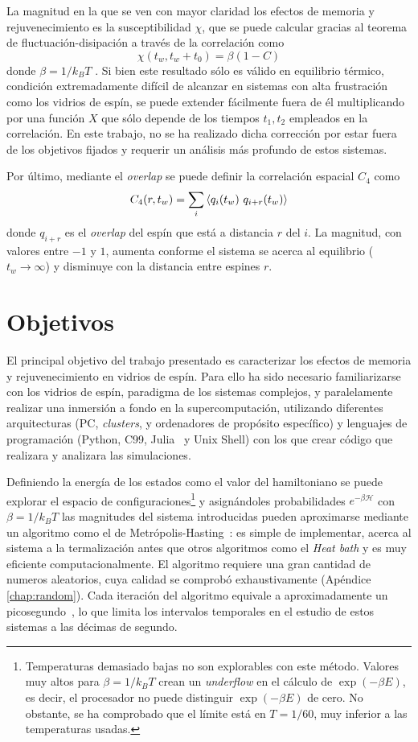 \documentclass[11pt]{report}
\newcommand{\Ham}{\mathscr{H}}
\newcommand{\sub}[1]{ _{{\scriptscriptstyle \mathit{#1}}}  }
\newcommand{\kb}{k\sub{B}}
\begin{document}
La magnitud en la que se ven con mayor claridad los efectos de memoria
y rejuvenecimiento es la susceptibilidad $χ$, que se puede calcular
gracias al teorema de fluctuación-disipación a través de la
correlación como
\begin{equation}
  χ(t_w, t_w+t_0) = β(1-C)
\end{equation}
donde $β=1/\kb T$ . Si bien este resultado sólo es válido en
equilibrio térmico, condición extremadamente difícil de alcanzar en
sistemas con alta frustración como los vidrios de espín, se puede
extender fácilmente fuera de él multiplicando por una función $X$ que
sólo depende de los tiempos $t_1,t_2$ empleados en la correlación. En
este trabajo, no se ha realizado dicha corrección por estar fuera de
los objetivos fijados y requerir un análisis más profundo de estos
sistemas.

Por último, mediante el \textit{overlap} se puede definir la
correlación espacial $C_4$ como
\begin{equation}
  C_4(r,t_w) =  \sum_{i} \expval{q_i(t_w)\ q_{i+r}(t_w)}
\end{equation}
donde $q_{i+r}$ es el \textit{overlap} del espín que está a distancia
$r$ del $i$. La magnitud, con valores entre $-1$ y $1$, aumenta
conforme el sistema se acerca al equilibrio ($t_w→∞$) y disminuye con
la distancia entre espines $r$.

\chapter{Objetivos}
El principal objetivo del trabajo presentado es caracterizar los
efectos de memoria y rejuvenecimiento en vidrios de espín. Para ello
ha sido necesario familiarizarse con los vidrios de espín, paradigma
de los sistemas complejos, y paralelamente realizar una inmersión a
fondo en la supercomputación, utilizando diferentes arquitecturas (PC,
\textit{clusters}, y ordenadores de propósito específico) y lenguajes
de programación (Python, C99, Julia~\cite{julialang} y Unix Shell)
con los que crear código que realizara y analizara las simulaciones.

Definiendo la energía de los estados como el valor del hamiltoniano se
puede explorar el espacio de configuraciones\footnote{ Temperaturas
  demasiado bajas no son explorables con este método. Valores muy
  altos para $β=1/\kb T$ crean un \textit{underflow} en el cálculo de
  $\exp(-βE)$, es decir, el procesador no puede distinguir $\exp(-βE)$
  de cero. No obstante, se ha comprobado que el límite está en
  $T=1/60$, muy inferior a las temperaturas usadas. } y asignándoles
probabilidades $e^{-β \Ham}$ con $β=1/\kb T$ las magnitudes del
sistema introducidas pueden aproximarse mediante un algoritmo como el
de Metrópolis-Hasting~\cite{metropolis}: es simple de implementar,
acerca al sistema a la termalización antes que otros algoritmos como
el \textit{Heat bath} y es muy eficiente computacionalmente. El
algoritmo requiere una gran cantidad de numeros aleatorios, cuya
calidad se comprobó exhaustivamente (Apéndice \ref{chap:random}). Cada
iteración del algoritmo equivale a aproximadamente un
picosegundo~\cite{tiempos}, lo que limita los intervalos temporales en
el estudio de estos sistemas a las décimas de segundo.
\end{document}

